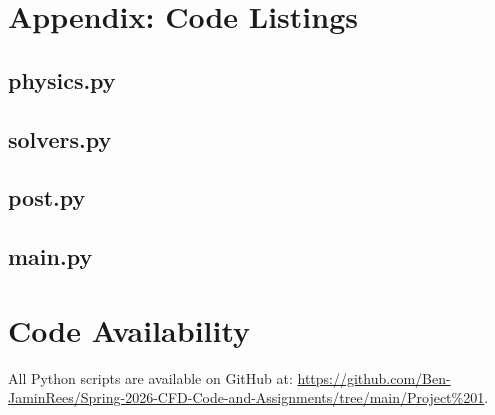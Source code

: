 \documentclass[11pt]{article}
\begin{document}
\section{Appendix: Code Listings}
\subsection{physics.py}


\subsection{solvers.py}


\subsection{post.py}


\subsection{main.py}


\section{Code Availability}
All Python scripts are available on GitHub at: \url{https://github.com/Ben-JaminRees/Spring-2026-CFD-Code-and-Assignments/tree/main/Project%201}.
\end{document}

